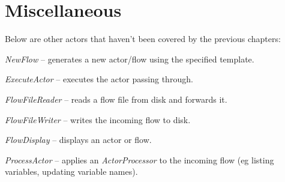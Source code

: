 \documentclass[a4paper]{book}
\begin{document}
\chapter{Miscellaneous}
Below are other actors that haven't been covered by the previous chapters:
\begin{tight_itemize}
  \item \textit{NewFlow} -- generates a new actor/flow using the specified
  template.
  \item \textit{ExecuteActor} -- executes the actor passing through.
  \item \textit{FlowFileReader} -- reads a flow file from disk and forwards it.
  \item \textit{FlowFileWriter} -- writes the incoming flow to disk.
  \item \textit{FlowDisplay} -- displays an actor or flow.
  \item \textit{ProcessActor} -- applies an \textit{ActorProcessor} to the
  incoming flow (eg listing variables, updating variable names).
\end{tight_itemize}


\end{document}
